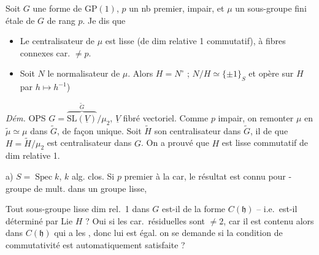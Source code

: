 \documentclass[11pt,a4paper]{article}
\begin{document}
Soit $G$ une forme de $\mathrm{GP}(1)$, \struck{\ill{}} $p$ un nb premier,
impair, et $\mu$ un sous-groupe fini étale de $G$ de rang $p$. Je dis que
\begin{itemize}
  \item[a)] Le centralisateur  de $\mu$ est lisse (de dim relative 1
  commutatif), à fibres connexes  car.  $\neq p$.
  \item[b)] Soit \struck{\ill{}} $N$ le normalisateur de $\mu$. Alors $H = N^{\circ}$ ;
  $N/H \simeq \lbrace \pm 1\rbrace_S$ et opère sur $H$ par
  \struck{\ill{}} $h \mapsto h^{-1}$)
\end{itemize}


\emph{Dém.} OPS $G = \overbrace{\mathrm{SL}(\underline{V})}^{\widetilde{G}}/\mu_2$,
$\underline{V}$ fibré vectoriel. Comme $p$ impair, on 
remonter $\mu$ en $\widetilde{\mu} \simeq \mu$ dans $\widetilde{G}$, de façon unique.
Soit $\widetilde{H}$ son centralisateur dans $\widetilde{G}$, il  de
 que $H = \widetilde{H}/\mu_2$ est  centralisateur
dans $G$. On a \struck{\ill{}} prouvé que $H$ est lisse commutatif de dim relative 1.

a) $S = \operatorname{Spec} k$, $k$  alg. clos. Si $p$ premier à la
car, le résultat  est connu pour  -groupe de
 mult. dans un groupe lisse,

Tout sous-groupe lisse   
dim rel.~1 dans $G$ est-il de la forme $C(\mathfrak{h})$ -- i.e.\ est-il
déterminé par Lie $H$ ? Oui  si les car.\
résiduelles sont $\neq 2$, car il est contenu alors dans $C(\mathfrak{h})$ qui a
les \uncertain{mêmes} \uncertain{fibres}, donc lui est égal. \uncertain{Mais} on se
demande si la condition de commutativité est automatiquement satisfaite ?
\end{document}
